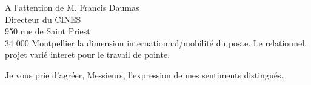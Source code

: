 \documentclass[12pt]{lettre}
\begin{document}
\begin{letter}{A l'attention de M. Francis Daumas\\Directeur du CINES\\950 rue de Saint Priest\\34 000 Montpellier}
{ la dimension internationnal/mobilité du poste. Le relationnel. projet varié
 interet pour le travail de pointe.
}


\closing{Je vous prie d'agréer, Messieurs, l'expression de mes sentiments distingués.}
\end{letter}
\end{document}
